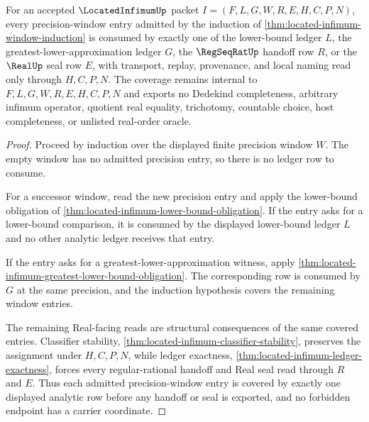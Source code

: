 \begin{theorem}
\label{thm:located-infimum-window-ledger-coverage}
For an accepted $\LocatedInfimumUp$ packet $I=(F,L,G,W,R,E,H,C,P,N)$, every precision-window entry admitted by the induction of \autoref{thm:located-infimum-window-induction} is consumed by exactly one of the lower-bound ledger $L$, the greatest-lower-approximation ledger $G$, the $\RegSeqRatUp$ handoff row $R$, or the $\RealUp$ seal row $E$, with transport, replay, provenance, and local naming read only through $H,C,P,N$. The coverage remains internal to $F,L,G,W,R,E,H,C,P,N$ and exports no Dedekind completeness, arbitrary infimum operator, quotient real equality, trichotomy, countable choice, host completeness, or unlisted real-order oracle.
\end{theorem}
\begin{proof}
Proceed by induction over the displayed finite precision window $W$. The empty window has no admitted precision entry, so there is no ledger row to consume.

For a successor window, read the new precision entry and apply the lower-bound obligation of \autoref{thm:located-infimum-lower-bound-obligation}. If the entry asks for a lower-bound comparison, it is consumed by the displayed lower-bound ledger $L$ and no other analytic ledger receives that entry.

If the entry asks for a greatest-lower-approximation witness, apply \autoref{thm:located-infimum-greatest-lower-bound-obligation}. The corresponding row is consumed by $G$ at the same precision, and the induction hypothesis covers the remaining window entries.

The remaining Real-facing reads are structural consequences of the same covered entries. Classifier stability, \autoref{thm:located-infimum-classifier-stability}, preserves the assignment under $H,C,P,N$, while ledger exactness, \autoref{thm:located-infimum-ledger-exactness}, forces every regular-rational handoff and Real seal read through $R$ and $E$. Thus each admitted precision-window entry is covered by exactly one displayed analytic row before any handoff or seal is exported, and no forbidden endpoint has a carrier coordinate.
\end{proof}

